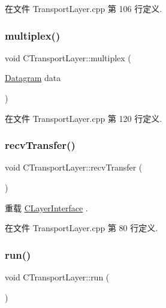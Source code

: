 在文件 Transport\+Layer.\+cpp 第 106 行定义.

\mbox{\label{class_c_transport_layer_aa5d4c185f3a0f9c968d51caf46f7332e}} 
\subsubsection{\texorpdfstring{multiplex()}{multiplex()}\hspace{0.1cm}{\footnotesize\ttfamily [2/2]}}
{\footnotesize\ttfamily void C\+Transport\+Layer\+::multiplex (\begin{DoxyParamCaption}\item[{\hyperlink{class_datagram}{Datagram}}]{data }\end{DoxyParamCaption})}



在文件 Transport\+Layer.\+cpp 第 120 行定义.

\mbox{\label{class_c_transport_layer_ad30133ccd6047d127d5a9feec593877d}} 
\subsubsection{\texorpdfstring{recv\+Transfer()}{recvTransfer()}}
{\footnotesize\ttfamily void C\+Transport\+Layer\+::recv\+Transfer (\begin{DoxyParamCaption}{ }\end{DoxyParamCaption})\hspace{0.3cm}{\ttfamily [virtual]}}



重载 \hyperlink{class_c_layer_interface_aca72cd6ae77b4e4b4c1d058377583110}{C\+Layer\+Interface} .



在文件 Transport\+Layer.\+cpp 第 80 行定义.

\mbox{\label{class_c_transport_layer_a60d1d41f33c5662eb9c1bbd1c8aa4dc3}} 
\subsubsection{\texorpdfstring{run()}{run()}}
{\footnotesize\ttfamily void C\+Transport\+Layer\+::run (\begin{DoxyParamCaption}{ }\end{DoxyParamCaption})}



